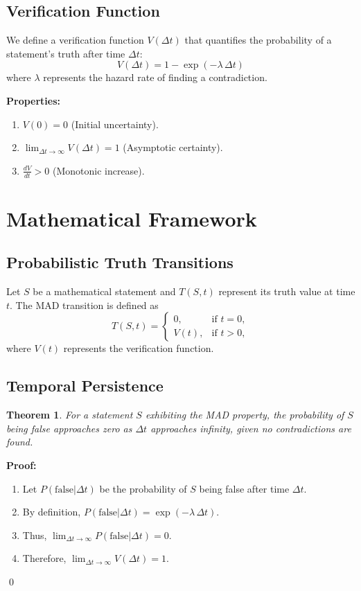 \documentclass[11pt]{article}
\newtheorem{theorem}{Theorem}[section]
\begin{document}
\subsection{Verification Function}

We define a verification function $V(\Delta t)$ that quantifies the probability of a statement's truth after time $\Delta t$:
\[
V(\Delta t) = 1 - \exp(-\lambda\,\Delta t)
\]
where $\lambda$ represents the hazard rate of finding a contradiction.

\noindent\textbf{Properties:}
\begin{enumerate}[label=(\alph*)]
    \item $V(0) = 0$ (Initial uncertainty).
    \item $\displaystyle \lim_{\Delta t\to\infty} V(\Delta t) = 1$ (Asymptotic certainty).
    \item $\displaystyle \frac{dV}{dt} > 0$ (Monotonic increase).
\end{enumerate}

\section{Mathematical Framework}

\subsection{Probabilistic Truth Transitions}

Let $S$ be a mathematical statement and $T(S,t)$ represent its truth value at time $t$. The MAD transition is defined as
\[
T(S,t) = \begin{cases}
0, & \text{if } t = 0, \\
V(t), & \text{if } t > 0,
\end{cases}
\]
where $V(t)$ represents the verification function.

\subsection{Temporal Persistence}

\begin{theorem}
For a statement $S$ exhibiting the MAD property, the probability of $S$ being false approaches zero as $\Delta t$ approaches infinity, given no contradictions are found.
\end{theorem}

\noindent\textbf{Proof:} 
\begin{enumerate}[label=(\roman*)]
    \item Let $P(\text{false}|\Delta t)$ be the probability of $S$ being false after time $\Delta t$.
    \item By definition, $P(\text{false}|\Delta t)=\exp(-\lambda\,\Delta t)$.
    \item Thus, $\displaystyle \lim_{\Delta t \to \infty}P(\text{false}|\Delta t) = 0$.
    \item Therefore, $\displaystyle \lim_{\Delta t \to \infty} V(\Delta t) = 1$.
\end{enumerate}
\qed
\end{document}
